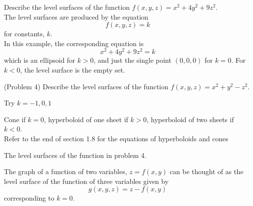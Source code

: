 \documentclass[handout]{ximera}
\begin{document}
\begin{example}[Example 4]
Describe the level surfaces of the function $f(x, y, z) = x^2 + 4y^2 + 9 z^2$.\\
The level surfaces are produced by the equation
\[
f(x, y, z) = k
\]
for constants, $k$.\\
In this example, the corresponding equation is
\[
x^2 + 4y^2 + 9z^2 = k
\]
which is an ellipsoid for $k >0$, and just the single point $(0, 0, 0)$ for $k = 0$.
For $k<0$, the level surface is the empty set.
\end{example}

\begin{problem}(Problem 4)
Describe the level surfaces of the function $f(x, y, z) = x^2 + y^2 - z^2$.\\
\begin{hint}
Try $k = -1, 0, 1$
\end{hint}
\begin{hint}
Cone if $k=0$, hyperboloid of one sheet if $k>0$, hyperboloid of two sheets if $k<0$.\\
Refer to the end of section 1.8 for the equations of hyperboloids and cones
\end{hint}
\end{problem}
The level surfaces of the function in problem 4.

\begin{center}
\end{center}

\begin{remark}
The graph of a function of two variables, $z= f(x,y)$ can be thought of as the level 
surface of the function of three variables given by 
\[
g(x, y, z) = z-f(x,y)
\]
corresponding to $k = 0$.
\end{remark}
\end{document}
